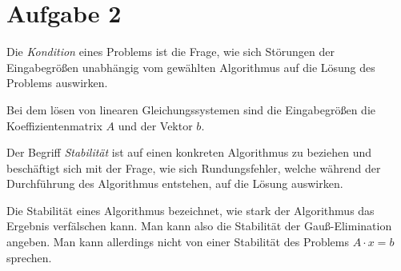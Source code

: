 \section*{Aufgabe 2}
Die \emph{Kondition} eines Problems ist die Frage, wie sich Störungen
der Eingabegrößen unabhängig vom gewählten Algorithmus auf die
Lösung des Problems auswirken.

Bei dem lösen von linearen Gleichungssystemen sind die Eingabegrößen
die Koeffizientenmatrix $A$ und der Vektor $b$.

Der Begriff \emph{Stabilität} ist auf einen konkreten Algorithmus
zu beziehen und beschäftigt sich mit der Frage, wie sich Rundungsfehler,
welche während der Durchführung des Algorithmus entstehen, auf
die Lösung auswirken.

Die Stabilität eines Algorithmus bezeichnet, wie stark der Algorithmus das Ergebnis verfälschen kann. Man kann also die Stabilität der Gauß-Elimination angeben. Man kann allerdings nicht von einer Stabilität des Problems $A \cdot x = b$ sprechen.